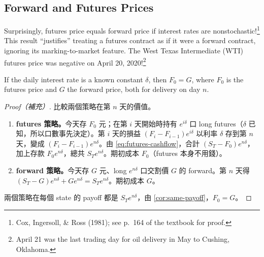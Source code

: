 \suppstart
{}
\suppend

\subsection{Forward and Futures Prices}


Surprisingly, futures price equals forward price if interest rates are nonstochastic!\footnote{Cox, Ingersoll, \& Ross (1981); see p.~164 of the textbook for proof.}
This result ``justifies'' treating a futures contract as if it were a forward contract, ignoring its marking-to-market feature.
The West Texas Intermediate (WTI) futures price was negative on April 20, 2020!\footnote{April 21 was the last trading day for oil delivery in May to Cushing, Oklahoma.}

\suppstart
{}

\begin{proposition}
	\label{prop:fwd-eq-futures}
	If the daily interest rate is a known constant $\delta$, then $F_{0}=G$, where $F_{0}$ is the futures price and $G$ the forward price, both for delivery on day $n$.
\end{proposition}

\begin{proof}[Proof（補充）]
	比較兩個策略在第 $n$ 天的價值。
	\begin{enumerate}[(1),nosep]
		\item \textbf{futures 策略。}今天存 $F_{0}$ 元；在第 $i$ 天開始時持有 $e^{i\delta}$ 口 long futures（$\delta$ 已知，所以口數事先決定）。第 $i$ 天的損益 $(F_{i}-F_{i-1})e^{i\delta}$ 以利率 $\delta$ 存到第 $n$ 天，變成 $(F_{i}-F_{i-1})e^{n\delta}$。由 \eqref{eq:futures-cashflow}，合計 $(S_{T}-F_{0})e^{n\delta}$，加上存款 $F_{0}e^{n\delta}$，總共 $S_{T}e^{n\delta}$。期初成本 $F_{0}$（futures 本身不用錢）。
		\item \textbf{forward 策略。}今天存 $G$ 元、long $e^{n\delta}$ 口交割價 $G$ 的 forward。第 $n$ 天得 $(S_{T}-G)e^{n\delta}+Ge^{n\delta}=S_{T}e^{n\delta}$。期初成本 $G$。
	\end{enumerate}
	兩個策略在每個 state 的 payoff 都是 $S_{T}e^{n\delta}$，由 \autoref{cor:same-payoff}，$F_{0}=G$。
\end{proof}
\suppend


